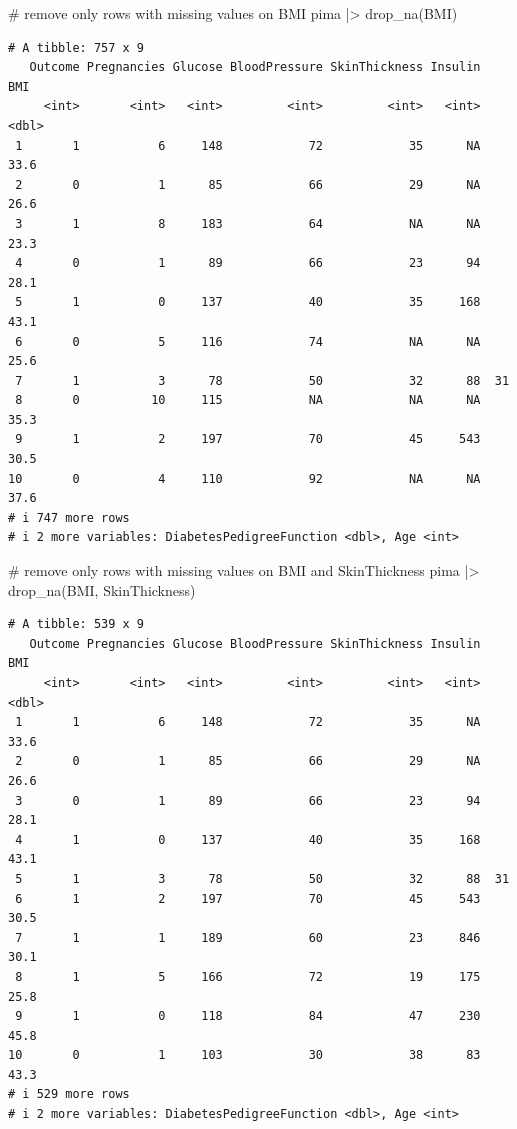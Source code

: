 \documentclass[
  letterpaper,
  DIV=11,
  numbers=noendperiod]{scrreprt}
\newenvironment{Shaded}{\begin{snugshade}}{\end{snugshade}}
\newcommand{\CommentTok}[1]{\textcolor[rgb]{0.37,0.37,0.37}{#1}}
\newcommand{\FunctionTok}[1]{\textcolor[rgb]{0.28,0.35,0.67}{#1}}
\newcommand{\NormalTok}[1]{\textcolor[rgb]{0.00,0.23,0.31}{#1}}
\newcommand{\SpecialCharTok}[1]{\textcolor[rgb]{0.37,0.37,0.37}{#1}}
\begin{document}
\begin{Shaded}
\begin{Highlighting}[]
\CommentTok{\# remove only rows with missing values on BMI}
\NormalTok{pima }\SpecialCharTok{|\textgreater{}} \FunctionTok{drop\_na}\NormalTok{(BMI)}
\end{Highlighting}
\end{Shaded}

\begin{verbatim}
# A tibble: 757 x 9
   Outcome Pregnancies Glucose BloodPressure SkinThickness Insulin   BMI
     <int>       <int>   <int>         <int>         <int>   <int> <dbl>
 1       1           6     148            72            35      NA  33.6
 2       0           1      85            66            29      NA  26.6
 3       1           8     183            64            NA      NA  23.3
 4       0           1      89            66            23      94  28.1
 5       1           0     137            40            35     168  43.1
 6       0           5     116            74            NA      NA  25.6
 7       1           3      78            50            32      88  31  
 8       0          10     115            NA            NA      NA  35.3
 9       1           2     197            70            45     543  30.5
10       0           4     110            92            NA      NA  37.6
# i 747 more rows
# i 2 more variables: DiabetesPedigreeFunction <dbl>, Age <int>
\end{verbatim}

\begin{Shaded}
\begin{Highlighting}[]
\CommentTok{\# remove only rows with missing values on BMI and SkinThickness}
\NormalTok{pima }\SpecialCharTok{|\textgreater{}} \FunctionTok{drop\_na}\NormalTok{(BMI, SkinThickness)}
\end{Highlighting}
\end{Shaded}

\begin{verbatim}
# A tibble: 539 x 9
   Outcome Pregnancies Glucose BloodPressure SkinThickness Insulin   BMI
     <int>       <int>   <int>         <int>         <int>   <int> <dbl>
 1       1           6     148            72            35      NA  33.6
 2       0           1      85            66            29      NA  26.6
 3       0           1      89            66            23      94  28.1
 4       1           0     137            40            35     168  43.1
 5       1           3      78            50            32      88  31  
 6       1           2     197            70            45     543  30.5
 7       1           1     189            60            23     846  30.1
 8       1           5     166            72            19     175  25.8
 9       1           0     118            84            47     230  45.8
10       0           1     103            30            38      83  43.3
# i 529 more rows
# i 2 more variables: DiabetesPedigreeFunction <dbl>, Age <int>
\end{verbatim}
\end{document}
